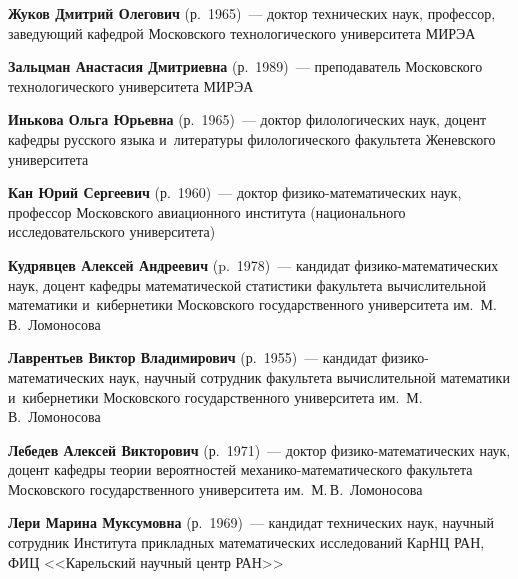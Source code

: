 \begin{multicols}{2}
\vspace*{3pt}

\noindent
\textbf{Жуков Дмитрий Олегович} (р.\ 1965)~--- 
доктор технических наук, профессор, заведующий ка\-фед\-рой Московского 
технологического университета МИРЭА 

\vspace*{3pt}

\noindent
\textbf{Зальцман Анастасия Дмитриевна} (р.\ 1989)~--- 
преподаватель Московского технологического университета МИРЭА

\vspace*{3pt}

\noindent
\textbf{Инькова Ольга Юрьевна}  (р.\ 1965)~--- 
доктор филологических наук, доцент кафедры русского языка и~литературы 
филологического факультета Женевского университета


\columnbreak

\noindent
\textbf{Кан Юрий Сергеевич} (р.\ 1960)~--- доктор фи\-зи\-ко-ма\-те\-ма\-ти\-че\-ских 
наук, профессор Московского авиационного института (национального исследовательского 
университета)

\vspace*{3pt}

\noindent
\textbf{Кудрявцев Алексей Андреевич} (p.\ 1978)~--- 
кандидат фи\-зи\-ко-ма\-те\-ма\-ти\-че\-ских наук, 
доцент кафедры математической ста\-ти\-сти\-ки 
факультета вы\-чис\-ли\-тель\-ной математики и~кибернетики Московского государственного 
университета им.\ М.\,В.~Ломоносова

\vspace*{3pt}

\noindent
\textbf{Лаврентьев Виктор Владимирович} (р.\ 1955)~--- 
кандидат фи\-зи\-ко-ма\-те\-ма\-ти\-че\-ских наук, научный
со\-трудник  факультета вычислительной математики и~кибернетики 
Московского государственного университета им.\ М.\,В.~Ломоносова

\vspace*{3pt}

\noindent
\textbf{Лебедев Алексей Викторович} (р.\ 1971)~---
доктор фи\-зи\-ко-ма\-те\-ма\-ти\-че\-ских наук,
доцент кафедры теории вероятностей ме\-ха\-ни\-ко-ма\-те\-ма\-ти\-че\-ско\-го 
факультета Московского государственного университета им.\ М.\,В.~Ломоносова

\vspace*{3pt}

\noindent
\textbf{Лери Марина Муксумовна} (р.\ 1969)~--- 
кандидат технических наук, научный со\-труд\-ник Института прикладных математических
 исследований КарНЦ РАН, ФИЦ <<Карельский научный центр РАН>>
 

\end{multicols}
